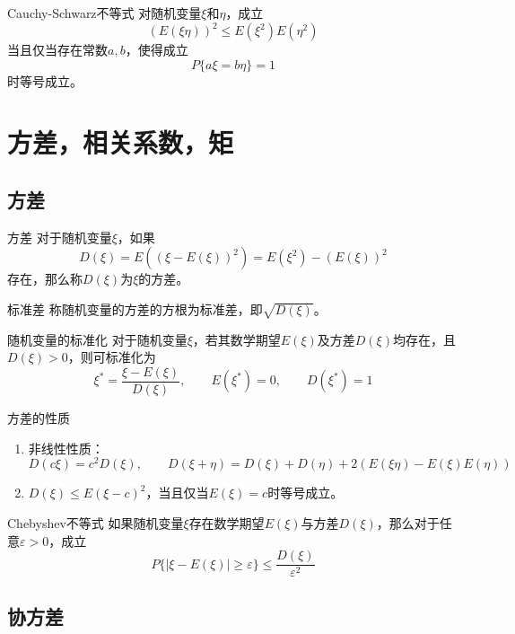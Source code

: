\documentclass[lang = cn, scheme = chinese, thmcnt = section]{elegantbook}
\begin{document}
\begin{theorem}{Cauchy-Schwarz不等式}
	对随机变量$\xi$和$\eta$，成立
	$$
	(E(\xi\eta))^2\le E(\xi^2)E(\eta^2)
	$$
	当且仅当存在常数$a,b$，使得成立
	$$
	P\{a\xi=b\eta\}=1
	$$
	时等号成立。
\end{theorem}

\section{方差，相关系数，矩}

\subsection{方差}

\begin{definition}{方差}
	对于随机变量$\xi$，如果
	$$
	D(\xi)
	=E((\xi-E(\xi))^2)
	=E(\xi^2)-(E(\xi))^2
	$$
	存在，那么称$D(\xi)$为$\xi$的方差。
\end{definition}

\begin{definition}{标准差}
	称随机变量的方差的方根为标准差，即$\sqrt{D(\xi)}$。
\end{definition}

\begin{definition}{随机变量的标准化}
	对于随机变量$\xi$，若其数学期望$E(\xi)$及方差$D(\xi)$均存在，且$D(\xi)>0$，则可标准化为
	$$
	\xi^*=\frac{\xi-E(\xi)}{D(\xi)},\qquad 
	E(\xi^*)=0,\qquad 
	D(\xi^*)=1
	$$
\end{definition}

\begin{proposition}{方差的性质}
	\begin{enumerate}
		\item 非线性性质：%
		$$
		D(c\xi)=c^2D(\xi),\qquad 
		D(\xi+\eta)=D(\xi)+D(\eta)+2(E(\xi\eta)-E(\xi) E(\eta))
		$$
		\item $D(\xi)\le E(\xi-c)^2$，当且仅当$E(\xi)=c$时等号成立。
	\end{enumerate}
\end{proposition}

\begin{theorem}{Chebyshev不等式}
	如果随机变量$\xi$存在数学期望$E(\xi)$与方差$D(\xi)$，那么对于任意$\varepsilon>0$，成立
	$$
	P\{ \mid \xi-E(\xi) \mid \ge\varepsilon\}\le\frac{D(\xi)}{\varepsilon^2}
	$$
\end{theorem}

\subsection{协方差}
\end{document}
